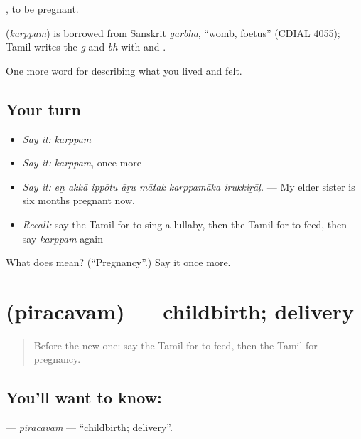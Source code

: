  , to be pregnant.

\begin{cousinweb}
\textbf{} (\emph{karppam}) is borrowed from Sanskrit \emph{garbha}, \textquotedblleft{}womb, foetus\textquotedblright{} (CDIAL 4055); Tamil writes the \emph{g} and \emph{bh} with  and .
\end{cousinweb}

\begin{grammarlens}[title={What you've built}]
One more word for describing what you lived and felt.
\end{grammarlens}

\subsection*{Your turn}
\begin{itemize}
\raggedright
  \item \emph{Say it:} \emph{karppam}
  \item \emph{Say it:} \emph{karppam}, once more
  \item \emph{Say it:} \emph{eṉ akkā ippōtu āṟu mātak karppamāka irukkiṟāḷ.} — My elder sister is six months pregnant now.
  \item \emph{Recall:} say the Tamil for to sing a lullaby, then the Tamil for to feed, then say \emph{karppam} again
\end{itemize}

\begin{tcolorbox}[breakable,colback=teal!4,colframe=teal!35!black,title={Before you move on}]
What does  mean? (\textquotedblleft{}Pregnancy\textquotedblright{}.) Say it once more.
\end{tcolorbox}
\section[\texorpdfstring{\ta{பிரசவம்} (piracavam)}{பிரசவம் (piracavam)}]{ (piracavam) — childbirth; delivery}

\label{lesson:TA-C496-piracavam}



\begin{quote}
Before the new one: say the Tamil for to feed, then the Tamil for pregnancy.
\end{quote}

\subsection*{You'll want to know: }
\textbf{} — \emph{piracavam} — \textquotedblleft{}childbirth; delivery\textquotedblright{}.

